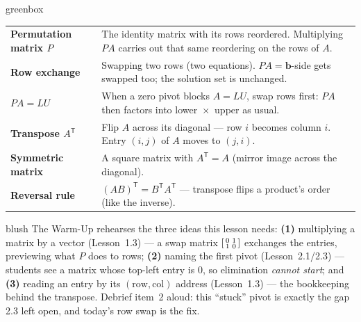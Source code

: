\documentclass[10pt]{article}
\newcommand{\bb}{\mathbf{b}}
\newcommand{\PP}{P}
\newcommand{\tp}{\mathsf{T}}
\begin{document}
\begin{skillbox}{greenbox}
\renewcommand{\arraystretch}{1.3}
\begin{tabularx}{\linewidth}{@{}l X@{}}
\textbf{Permutation matrix $\PP$} & The identity matrix with its rows reordered. Multiplying $\PP A$ carries out that same reordering on the rows of $A$. \\
\textbf{Row exchange} & Swapping two rows (two equations). $\PP A=\bb$-side gets swapped too; the solution set is unchanged. \\
\textbf{$\PP A=LU$} & When a zero pivot blocks $A=LU$, swap rows first: $\PP A$ then factors into lower~$\times$~upper as usual. \\
\textbf{Transpose $A^{\tp}$} & Flip $A$ across its diagonal --- row $i$ becomes column $i$. Entry $(i,j)$ of $A$ moves to $(j,i)$. \\
\textbf{Symmetric matrix} & A square matrix with $A^{\tp}=A$ (mirror image across the diagonal). \\
\textbf{Reversal rule} & $(AB)^{\tp}=B^{\tp}A^{\tp}$ --- transpose flips a product's order (like the inverse). \\
\end{tabularx}
\end{skillbox}

\begin{fixedskillbox}{blush}
    The Warm-Up rehearses the three ideas this lesson needs: \textbf{(1)} multiplying a matrix by a
    vector (Lesson~1.3) --- a swap matrix $\begin{bsmallmatrix} 0&1\\1&0 \end{bsmallmatrix}$ exchanges the
    entries, previewing what $\PP$ does to rows; \textbf{(2)} naming the first pivot (Lesson~2.1/2.3) ---
    students see a matrix whose top-left entry is $0$, so elimination \emph{cannot start}; and
    \textbf{(3)} reading an entry by its $(\text{row},\text{col})$ address (Lesson~1.3) --- the
    bookkeeping behind the transpose. Debrief item~2 aloud: this ``stuck'' pivot is exactly the gap 2.3
    left open, and today's row swap is the fix.
\end{fixedskillbox}
\end{document}
